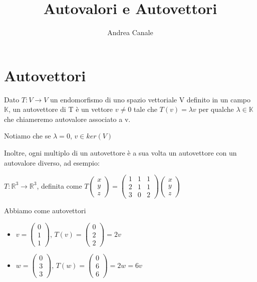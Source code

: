 \documentclass[a4paper, 10pt]{article}
\title{Autovalori e Autovettori}
\author{Andrea Canale}
\begin{document}
	\maketitle
	\tableofcontents

\section{Autovettori}

Dato $T:V \rightarrow V$ un endomorfismo di uno spazio vettoriale V definito in un campo $\mathbb{K}$, un autovettore di T è un vettore $v \neq 0$ tale che $T(v)=\lambda v$ per qualche $\lambda \in \mathbb{K}$ che chiameremo autovalore associato a v.

Notiamo che se $\lambda = 0$, $v \in ker(V)$

Inoltre, ogni multiplo di un autovettore è a sua volta un autovettore con un autovalore diverso, ad esempio:

$T: \mathbb{R}^3 \rightarrow \mathbb{R}^3$, definita come $T\begin{pmatrix}
	x \\
	y \\
	z 
\end{pmatrix} = \begin{pmatrix}
1 & 1 & 1 \\
2 & 1 & 1 \\
3 & 0 & 2 
\end{pmatrix}\begin{pmatrix}
x \\
y \\
z 
\end{pmatrix} $

Abbiamo come autovettori

\begin{itemize}
	\item $v=\begin{pmatrix}
		0 \\
		1 \\
		1 
	\end{pmatrix}$, $T(v) = \begin{pmatrix}
		0 \\
		2 \\
		2 
	\end{pmatrix} = 2v$
	\item $w=\begin{pmatrix}
		0 \\
		3 \\
		3 
	\end{pmatrix}$, $T(w) = \begin{pmatrix}
		0 \\
		6 \\
		6 
	\end{pmatrix} = 2w = 6v$
\end{itemize} 
\end{document}
